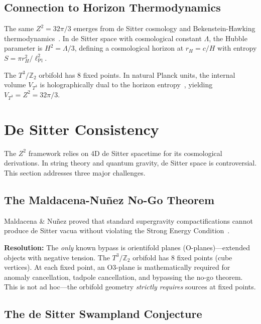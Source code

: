 \documentclass[aps,prd,twocolumn,superscriptaddress,nofootinbib]{revtex4-2}
\newcommand{\Zs}{Z^2}
\newcommand{\lPl}{\ell_{\mathrm{Pl}}}
\begin{document}
\subsection{Connection to Horizon Thermodynamics}

The same $\Zs = 32\pi/3$ emerges from de Sitter cosmology and Bekenstein-Hawking thermodynamics~\cite{Bekenstein1973,Hawking1974}. In de Sitter space with cosmological constant $\Lambda$, the Hubble parameter is $H^2 = \Lambda/3$, defining a cosmological horizon at $r_H = c/H$ with entropy $S = \pi r_H^2/\lPl^2$.

The $T^3/\mathbb{Z}_2$ orbifold has 8 fixed points. In natural Planck units, the internal volume $V_{T^3}$ is holographically dual to the horizon entropy~\cite{Maldacena1998}, yielding $V_{T^3} = \Zs = 32\pi/3$.

\section{De Sitter Consistency}
\label{sec:dS}

The $\Zs$ framework relies on 4D de Sitter spacetime for its cosmological derivations. In string theory and quantum gravity, de Sitter space is controversial. This section addresses three major challenges.

\subsection{The Maldacena-Nu\~nez No-Go Theorem}

Maldacena \& Nu\~nez proved that standard supergravity compactifications cannot produce de Sitter vacua without violating the Strong Energy Condition~\cite{MaldacenaNunez2001}.

\textbf{Resolution:} The \emph{only} known bypass is orientifold planes (O-planes)---extended objects with negative tension. The $T^3/\mathbb{Z}_2$ orbifold has 8 fixed points (cube vertices). At each fixed point, an O3-plane is mathematically required for anomaly cancellation, tadpole cancellation, and bypassing the no-go theorem. This is not ad hoc---the orbifold geometry \emph{strictly requires} sources at fixed points.

\subsection{The de Sitter Swampland Conjecture}
\end{document}
